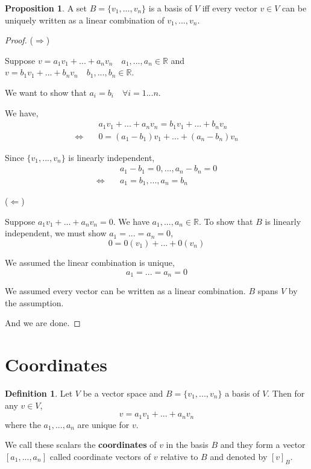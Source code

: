 \documentclass{report}
\theoremstyle{definition}
\newtheorem*{_def}{Definition}
\newtheorem{_prop}[_thm]{Proposition}
\theoremstyle{remark}
\begin{document}
\begin{_prop}
A set $B=\{v_1,...,v_n\}$ is a basis of $V$ iff every vector $v\in V$ can be uniquely written as a linear combination of $v_1,...,v_n$.
\end{_prop}

\begin{proof} ($\Rightarrow$)

Suppose $v=a_1v_1+...+a_nv_n\quad a_1,...,a_n\in \mathbb{R}$ and $v=b_1v_1+...+b_nv_n\quad b_1,...,b_n\in \mathbb{R}$.

We want to show that $a_i=b_i\quad \forall i=1...n$.

We have,
\begin{align*}
& a_1v_1+...+a_nv_n=b_1v_1+...+b_nv_n \\
\Leftrightarrow \quad & 0=(a_1-b_1)v_1+...+(a_n-b_n)v_n
\end{align*}

Since $\{v_1,...,v_n\}$ is linearly independent,
\begin{align*}
& a_1-b_1=0,...,a_n-b_n=0 \\
\Leftrightarrow \quad & a_1=b_1,...,a_n=b_n
\end{align*}

($\Leftarrow$)

Suppose $a_1v_1+...+a_nv_n=0$. 
We have $a_1,...,a_n\in \mathbb{R}$.
To show that $B$ is linearly independent, we must show $a_1=...=a_n=0$,
\[0=0(v_1)+...+0(v_n)\]

We assumed the linear combination is unique,
\[a_1=...=a_n=0\]

We assumed every vector can be written as a linear combination.
$B$ spans $V$ by the assumption.

And we are done.
\end{proof}

\section{Coordinates}

\begin{_def}
Let $V$ be a vector space and $B=\{v_1,...,v_n\}$ a basis of $V$.
Then for any $v\in V$,
\[v=a_1v_1+...+a_nv_n\]
where the $a_1,...,a_n$ are unique for $v$.

We call these scalars the \textbf{coordinates} of $v$ in the basis $B$ and they form a vector $[a_1,...,a_n]$ called coordinate vectors of $v$ relative to $B$ and denoted by $[v]_B$.
\end{_def}
\end{document}
